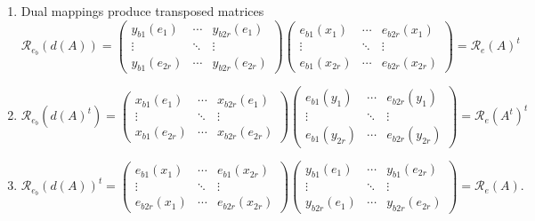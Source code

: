 \documentclass[aps,preprint]{revtex4}
\begin{document}
\begin{enumerate}
\begin{enumerate}
\item Dual mappings produce transposed matrices \label{Dual mappings produce
transposed matrices} 
\begin{equation}
\mathcal{R}_{e_{b}}\left( d\left( A\right) \right) =\left( 
\begin{array}{ccc}
y_{b1}\left( e_{1}\right) & \cdots & y_{b2r}\left( e_{1}\right) \\ 
\vdots & \ddots & \vdots \\ 
y_{b1}\left( e_{2r}\right) & \cdots & y_{b2r}\left( e_{2r}\right)%
\end{array}%
\right) \left( 
\begin{array}{ccc}
e_{b1}\left( x_{1}\right) & \cdots & e_{b2r}\left( x_{1}\right) \\ 
\vdots & \ddots & \vdots \\ 
e_{b1}\left( x_{2r}\right) & \cdots & e_{b2r}\left( x_{2r}\right)%
\end{array}%
\right) =\mathcal{R}_{e}\left( A\right) ^{t}
\end{equation}

\item 
\begin{equation}
\mathcal{R}_{e_{b}}\left( d\left( A\right) ^{t}\right) =\left( 
\begin{array}{ccc}
x_{b1}\left( e_{1}\right) & \cdots & x_{b2r}\left( e_{1}\right) \\ 
\vdots & \ddots & \vdots \\ 
x_{b1}\left( e_{2r}\right) & \cdots & x_{b2r}\left( e_{2r}\right)%
\end{array}%
\right) \left( 
\begin{array}{ccc}
e_{b1}\left( y_{1}\right) & \cdots & e_{b2r}\left( y_{1}\right) \\ 
\vdots & \ddots & \vdots \\ 
e_{b1}\left( y_{2r}\right) & \cdots & e_{b2r}\left( y_{2r}\right)%
\end{array}%
\right) =\mathcal{R}_{e}\left( A^{t}\right) ^{t}
\end{equation}

\item 
\begin{equation}
\mathcal{R}_{e_{b}}\left( d\left( A\right) \right) ^{t}=\left( 
\begin{array}{ccc}
e_{b1}\left( x_{1}\right) & \cdots & e_{b1}\left( x_{2r}\right) \\ 
\vdots & \ddots & \vdots \\ 
e_{b2r}\left( x_{1}\right) & \cdots & e_{b2r}\left( x_{2r}\right)%
\end{array}%
\right) \left( 
\begin{array}{ccc}
y_{b1}\left( e_{1}\right) & \cdots & y_{b1}\left( e_{2r}\right) \\ 
\vdots & \ddots & \vdots \\ 
y_{b2r}\left( e_{1}\right) & \cdots & y_{b2r}\left( e_{2r}\right)%
\end{array}%
\right) =\mathcal{R}_{e}\left( A\right) .
\end{equation}
\end{enumerate}
\end{enumerate}
\end{document}
